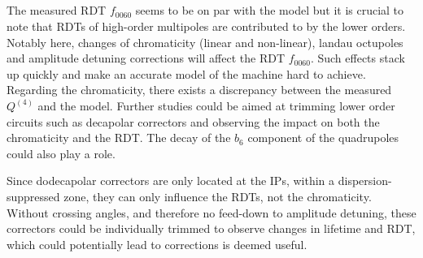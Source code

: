 \subsection{}

The measured RDT $f_{0060}$ seems to be on par with the model but it is crucial to note that RDTs
of high-order multipoles are contributed to by the lower orders. Notably here, changes of
chromaticity (linear and non-linear), landau octupoles and amplitude detuning corrections will
affect the RDT $f_{0060}$. Such effects stack up quickly and make an accurate model of the machine
hard to achieve. Regarding the chromaticity, there exists a discrepancy between the measured
$Q^{(4)}$ and the model. Further studies could be aimed at trimming lower order circuits such as
decapolar correctors and observing the impact on both the chromaticity and the RDT. The decay of the
$b_6$ component of the quadrupoles could also play a role.

Since dodecapolar correctors are only located at the IPs, within a dispersion-suppressed zone, they
can only influence the RDTs, not the chromaticity. Without crossing angles, and therefore no
feed-down to amplitude detuning, these correctors could be individually trimmed to observe changes
in lifetime and RDT, which could potentially lead to corrections is deemed useful.